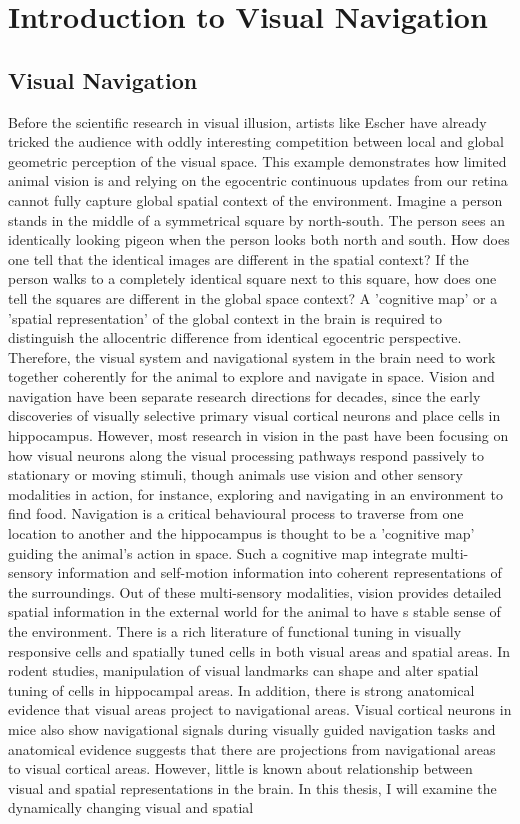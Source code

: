 \chapter{Introduction to Visual Navigation}
\label{chapterlabel1}

\section{Visual Navigation}
Before the scientific research in visual illusion, artists like Escher have already tricked the audience with oddly interesting competition between local and global geometric perception of the visual space. This example demonstrates how limited animal vision is and relying on the egocentric continuous updates from our retina cannot fully capture global spatial context of the environment. Imagine a person stands in the middle of a symmetrical square by north-south. The person sees an identically looking pigeon when the person looks both north and south. How does one tell that the identical images are different in the spatial context? If the person walks to a completely identical square next to this square, how does one tell the squares are different in the global space context? A 'cognitive map' or a 'spatial representation' of the global context in the brain is required to distinguish the allocentric difference from identical egocentric perspective. Therefore, the visual system and navigational system in the brain need to work together coherently for the animal to explore and navigate in space. Vision and navigation have been separate research directions for decades, since the early discoveries of visually selective primary visual cortical neurons and place cells in hippocampus. However, most research in vision in the past have been focusing on how visual neurons along the visual processing pathways respond passively to stationary or moving stimuli, though animals use vision and other sensory modalities in action, for instance, exploring and navigating in an environment to find food. Navigation is a critical behavioural process to traverse from one location to another and the hippocampus is thought to be a 'cognitive map' guiding the animal's action in space. Such a cognitive map integrate multi-sensory information and self-motion information into coherent representations of the surroundings. Out of these multi-sensory modalities, vision provides detailed spatial information in the external world for the animal to have s stable sense of the environment. There is a rich literature of functional tuning in visually responsive cells and spatially tuned cells in both visual areas and spatial areas. In rodent studies, manipulation of visual landmarks can shape and alter spatial tuning of cells in hippocampal areas. In addition, there is strong anatomical evidence that visual areas project to navigational areas. Visual cortical neurons in mice also show navigational signals during visually guided navigation tasks and anatomical evidence suggests that there are projections from navigational areas to visual cortical areas. However, little is known about relationship between visual and spatial representations in the brain. In this thesis, I will examine the dynamically changing visual and spatial 